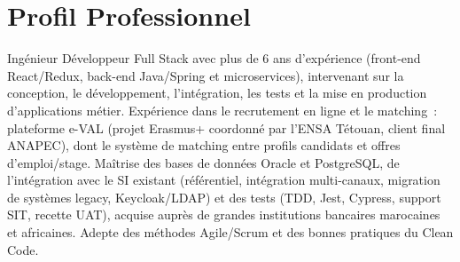 \section*{Profil Professionnel}

Ingénieur Développeur Full Stack avec plus de 6 ans d'expérience (front-end React/Redux, back-end Java/Spring et
microservices), intervenant sur la conception, le développement, l'intégration, les tests et la mise en production d'applications métier.
Expérience dans le recrutement en ligne et le matching~: plateforme e-VAL (projet Erasmus+ coordonné par l'ENSA
Tétouan, client final ANAPEC), dont le système de matching entre profils candidats et offres d'emploi/stage.
Maîtrise des bases de données Oracle et PostgreSQL, de l'intégration avec le SI existant (référentiel,
intégration multi-canaux, migration de systèmes legacy, Keycloak/LDAP) et des tests (TDD, Jest, Cypress,
support SIT, recette UAT), acquise auprès de grandes institutions bancaires marocaines et africaines. Adepte
des méthodes Agile/Scrum et des bonnes pratiques du Clean Code.
